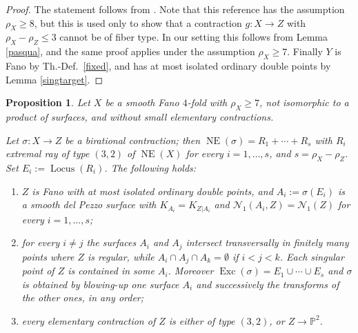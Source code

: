 \documentclass[a4paper,12pt]{amsart}
\newtheorem{proposition}[thm]{Proposition}
\theoremstyle{definition}
\numberwithin{figure}{section}
\numberwithin{table}{section}
\newcommand{\pr}{\mathbb{P}}
\newcommand{\N}{\mathcal{N}_1}
\newcommand{\NE}{\operatorname{NE}}
\newcommand{\Exc}{\operatorname{Exc}}
\newcommand{\Lo}{\operatorname{Locus}}
\begin{document}
\begin{proof}
The statement follows from \cite[Th.~4.1]{32}. Note that this reference
has the assumption $\rho_X\geq 8$, but this is used only to show that a contraction $g\colon X\to Z$ with $\rho_X-\rho_Z\leq 3$ cannot be of fiber type. In our setting this follows from Lemma \ref{pasqua}, and the same proof applies under the assumption $\rho_X\geq 7$.
Finally $Y$ is Fano by Th.-Def.~\ref{fixed}, and 
 has at most isolated ordinary double points by Lemma \ref{singtarget}.
\end{proof}
\begin{proposition}\label{rex}
  Let $X$ be a smooth Fano $4$-fold with $\rho_X\geq 7$, not isomorphic to a product of surfaces, and without small elementary contractions.
  
   Let $\sigma\colon X\to Z$ be a birational contraction; then $\NE(\sigma)=R_1+\cdots+R_s$ with $R_i$ extremal ray of type $(3,2)$ of $\NE(X)$ for every $i=1,\dotsc,s$, and $s=\rho_X-\rho_Z$. Set $E_i:=\Lo(R_i)$.
   The following holds:
   \begin{enumerate}[$(a)$]
   \item   $Z$ is Fano with at most isolated ordinary double points, and $A_i:=\sigma(E_{i})$ is a smooth del Pezzo surface with $K_{A_i}=K_{Z|A_i}$ and $\N(A_i,Z)=\N(Z)$ for every $i=1,\dotsc,s$;
\item
    for every $i\neq j$ the surfaces $A_i$ and $A_j$ intersect transversally in finitely many points where $Z$ is regular, while $A_i\cap A_j\cap A_k=\emptyset$ if $i<j<k$. Each singular point of $Z$ is contained in some  $A_i$. Moreover $\Exc(\sigma)=E_{1}\cup\cdots\cup E_{s}$ and $\sigma$ is obtained
    by blowing-up one surface $A_i$ and successively the transforms of the other ones, in any order;
  \item every elementary contraction of $Z$ is either of type $(3,2)$, or $Z\to\pr^2$.
    \end{enumerate}
\end{proposition}
\end{document}

